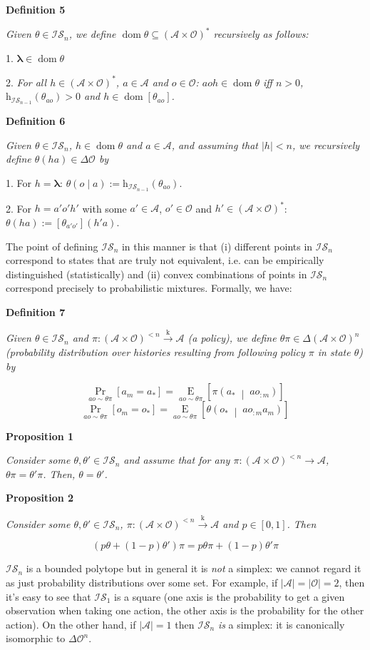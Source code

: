 \documentclass[a4paper]{article}
\newcommand{\Co}[1]{}
\DeclareMathOperator{\Dom}{dom}
\newcommand{\AP}[1]{\left(#1\right)}
\newcommand{\AB}[1]{\left[#1\right]}
\newcommand{\APM}[2]{\left(#1\;\middle\vert\;#2\right)}
\newcommand{\Pa}[2]{\underset{#1}{\operatorname{Pr}}\AB{#2}}
\newcommand{\Ea}[2]{\underset{#1}{\operatorname{E}}\AB{#2}}
\newcommand{\Estr}{\boldsymbol{\lambda}}
\newcommand{\Abs}[1]{\left\vert #1 \right\vert}
\newcommand{\K}{\xrightarrow{\mathrm{k}}}
\newcommand{\A}{\mathcal{A}}
\newcommand{\Ob}{\mathcal{O}}
\newcommand{\AO}{\AP{\A\times\Ob}}
\newcommand{\FH}{\AO^*}
\newcommand{\Ht}{\mathrm{h}}
\newcommand{\IS}{\mathcal{IS}}
\begin{document}
\textbf{Definition 5}\Co{b}

\textit{Given $\theta\in\IS_n$, we define $\Dom\theta\subseteq\FH$ recursively as follows:}

1. $\Estr\in\Dom\theta$

2. \textit{For all $h\in\FH$, $a\in\A$ and $o\in\Ob$: $aoh\in\Dom\theta$ iff $n>0$, $\Ht_{\IS_{n-1}}(\theta_{ao})>0$ and $h\in\Dom\AB{\theta_{ao}}$.}

\textbf{Definition 6}

\textit{Given $\theta\in\IS_n$, $h\in\Dom\theta$ and $a\in\A$, and assuming that $\Abs{h}<n$, we recursively define $\theta(ha)\in\Delta\Ob$ by}\Co{i}

1. For $h=\Estr$: $\theta( o\mid a):=\Ht_{\IS_{n-1}}(\theta_{ao})$.

2. For $h=a'o'h'$ with some $a'\in\A$, $o'\in\Ob$ and $h'\in\FH$: $\theta(ha):=\AB{\theta_{a'o'}}(h'a)$.

The point of defining $\IS_n$ in this manner is that (i) different points in $\IS_n$ correspond to states that are truly not equivalent, i.e. can be empirically distinguished (statistically) and (ii) convex combinations of points in $\IS_n$ correspond precisely to probabilistic mixtures. Formally, we have:

\textbf{Definition 7}\Co{b}

\textit{Given $\theta\in\IS_n$ and $\pi:\AO^{<n}\K\A$ (a policy), we define $\theta\pi\in\Delta\AO^n$ (probability distribution over histories resulting from following policy $\pi$ in state $\theta$) by}\Co{i}

$$\Pa{ao\sim\theta\pi}{a_m=a_*}=\Ea{ao\sim\theta\pi}{\pi\APM{a_*}{ao_{:m}}}$$
$$\Pa{ao\sim\theta\pi}{o_m=o_*}=\Ea{ao\sim\theta\pi}{\theta\APM{o_*}{ao_{:m}a_m}}$$

\textbf{Proposition 1}\Co{b}

\textit{Consider some $\theta,\theta'\in\IS_n$ and assume that for any $\pi:\AO^{<n}\rightarrow\A$, $\theta\pi=\theta'\pi$. Then, $\theta=\theta'$.}\Co{i}

\textbf{Proposition 2}\Co{b}

\textit{Consider some $\theta,\theta'\in\IS_n$,  $\pi:\AO^{<n}\K\A$ and $p\in[0,1]$. Then}\Co{i}

$$\AP{p\theta+(1-p)\theta'}\pi=p\theta\pi+(1-p)\theta'\pi$$

$\IS_n$ is a bounded polytope but in general it is \textit{not} a simplex: we cannot regard it as just probability distributions over some set. For example, if $\Abs{\A}=\Abs{\Ob}=2$, then it's easy to see that $\IS_1$ is a square (one axis is the probability to get a given observation when taking one action, the other axis is the probability for the other action). On the other hand, if $\Abs{\A}=1$ then $\IS_n$ \textit{is}\Co{i} a simplex: it is canonically isomorphic to $\Delta\Ob^n$.
\end{document}
